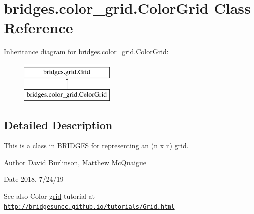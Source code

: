 \hypertarget{classbridges_1_1color__grid_1_1_color_grid}{}\section{bridges.\+color\+\_\+grid.\+Color\+Grid Class Reference}
\label{classbridges_1_1color__grid_1_1_color_grid}
Inheritance diagram for bridges.\+color\+\_\+grid.\+Color\+Grid\+:\begin{figure}[H]
\begin{center}
\leavevmode
\includegraphics[height=2.000000cm]{classbridges_1_1color__grid_1_1_color_grid}
\end{center}
\end{figure}


\subsection{Detailed Description}
This is a class in B\+R\+I\+D\+G\+ES for representing an (n x n) grid. 

\begin{DoxyAuthor}{Author}
David Burlinson, Matthew Mc\+Quaigue
\end{DoxyAuthor}
\begin{DoxyDate}{Date}
2018, 7/24/19
\end{DoxyDate}
\begin{DoxySeeAlso}{See also}
Color \hyperlink{namespacebridges_1_1grid}{grid} tutorial at \href{http://bridgesuncc.github.io/tutorials/Grid.html}{\tt http\+://bridgesuncc.\+github.\+io/tutorials/\+Grid.\+html} 
\end{DoxySeeAlso}

